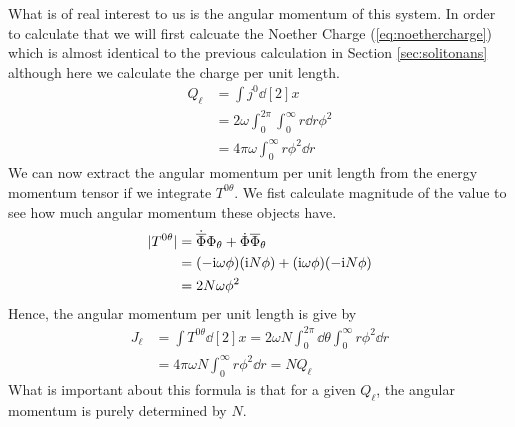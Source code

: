 What is of real interest to us is the angular momentum of this system. In order to calculate that we will first calcuate the Noether Charge (\ref{eq:noethercharge}) which is almost identical to the previous calculation in Section \ref{sec:solitonans} although here we calculate the charge per unit length.
\begin{align}
Q_\ell & = \int j^0\dd[2]{x} \\
 & = 2\omega \int_0^{2\pi}\int_0^\infty r\dd{r}\phi^2 \\
  & = 4\pi\omega \int_0^\infty r\phi^2 \dd{r} \label{eq:spincharge}
\end{align}
We can now extract the angular momentum per unit length from the energy momentum tensor if we integrate $T^{0\theta}$. We fist calculate magnitude of the value to see how much angular momentum these objects have.
\begin{align}
|T^{0\theta}| & = \dot{\overline{\Phi}}\Phi_\theta + \dot{\Phi}\overline{\Phi}_\theta \\
 & = (-\mathrm{i}\omega\phi)(\mathrm{i} N\phi) + (\mathrm{i}\omega\phi)(-\mathrm{i} N\phi) \\
 & = 2N\omega\phi^2
\end{align}
Hence, the angular momentum per unit length is give by
\begin{align}
J_\ell & = \int T^{0\theta}\dd[2]{x} = 2\omega N\int_0^{2\pi}\dd{\theta}\int_0^\infty r\phi^2\dd{r} \\
 & = 4\pi\omega N\int_0^\infty r\phi^2\dd{r} = NQ_\ell
\end{align}
What is important about this formula is that for a given $Q_\ell$, the angular momentum is purely determined by $N$.

